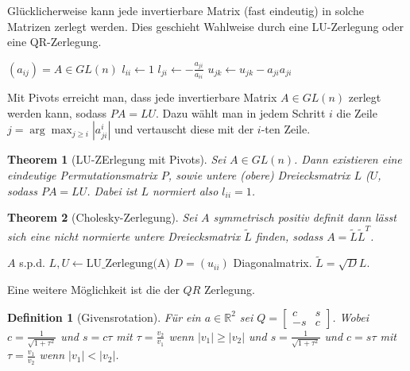 \documentclass[10pt,a4paper]{article}
\newtheorem{theorem}{Theorem}
\newtheorem{definition}{Definition}
\begin{document}
	Glücklicherweise kann jede invertierbare Matrix (fast eindeutig) in solche Matrizen zerlegt werden. Dies geschieht Wahlweise durch eine LU-Zerlegung oder eine QR-Zerlegung.
	\begin{algorithm}
		\caption{LU-Zerlegung ohne Pivots}
		\begin{algorithmic}
			\Require $(a_{ij}) = A \in GL(n)$
				\State $l_{ii} \leftarrow 1$
					\State $l_{ji} \leftarrow -\frac{a_{ji}}{a_{ii}}$
						\State $u_{jk} \leftarrow u_{jk} - a_{ji}a_{ji}$
					\EndFor
				\EndFor
			\EndFor
		\end{algorithmic}
	\end{algorithm}
	Mit Pivots erreicht man, dass jede invertierbare Matrix $A \in GL(n)$ zerlegt werden kann, sodass $PA = LU$. Dazu wählt man in jedem Schritt $i$ die Zeile $j = \arg \max_{j\geq i} |a^i_{ji}|$ und vertauscht diese mit der $i$-ten Zeile. 
	\begin{theorem}[LU-ZErlegung mit Pivots]
		Sei $A \in GL(n)$. Dann existieren eine eindeutige Permutationsmatrix $P$, sowie untere (obere) Dreiecksmatrix $L$ ($U$, sodass $PA =LU$. Dabei ist $L$ normiert also $l_{ii}= 1$.
	\end{theorem}
	\begin{theorem}[Cholesky-Zerlegung]
		Sei $A$ symmetrisch positiv definit dann lässt sich eine nicht normierte untere Dreiecksmatrix $\tilde{L}$ finden, sodass $A = \tilde{L}\tilde{L}^T$.
	\end{theorem}
	\begin{algorithm}
		\caption{Berechnung der Cholesky Zerlegung}
		\begin{algorithmic}
			\Require $A$ s.p.d.
			\State $L, U \leftarrow \text{LU\_Zerlegung(A)}$
			\State $D = (u_{ii})$ Diagonalmatrix.
			\State $\tilde{L} = \sqrt{D}L$.
		\end{algorithmic}
	\end{algorithm}
	Eine weitere Möglichkeit ist die der $QR$ Zerlegung. 
	\begin{definition}[Givensrotation]
		Für ein $a \in \mathbb{R}^2$ sei $Q=\begin{bmatrix}
			c & s \\
			-s & c
		\end{bmatrix}$. Wobei $c=\frac{1}{\sqrt{1+\tau^2}}$ und $s=c\tau$ mit $\tau = \frac{v_2}{v_1}$ wenn $|v_1| \geq |v_2|$ und  $s=\frac{1}{\sqrt{1+\tau^2}}$ und $c=s\tau$ mit $\tau = \frac{v_1}{v_2}$ wenn $|v_1| < |v_2|$.
	\end{definition}
\end{document}

